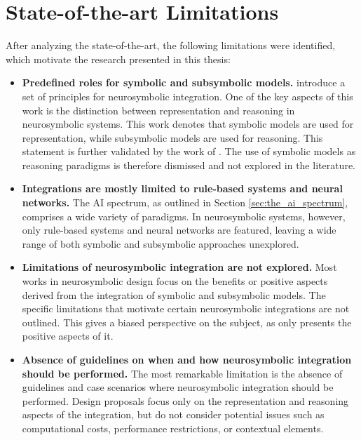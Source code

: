 \section{State-of-the-art Limitations}\label{3_sec:limitations}
After analyzing the state-of-the-art, the following limitations were identified, which motivate the research presented in this thesis:
\begin{itemize}
    \item \textbf{Predefined roles for symbolic and subsymbolic models.} \cite{besold_neural-symbolic_2017} introduce a set of principles for neurosymbolic integration. One of the key aspects of this work is the distinction between representation and reasoning in neurosymbolic systems. This work denotes that symbolic models are used for representation, while subsymbolic models are used for reasoning. This statement is further validated by the work of \cite{garcez_neural-symbolic_2019}. The use of symbolic models as reasoning paradigms is therefore dismissed and not explored in the literature.
    
    \item \textbf{Integrations are mostly limited to rule-based systems and neural networks.} The AI spectrum, as outlined in Section \ref{sec:the_ai_spectrum}, comprises a wide variety of paradigms. In neurosymbolic systems, however, only rule-based systems and neural networks are featured, leaving a wide range of both symbolic and subsymbolic approaches unexplored. 
    
    \item \textbf{Limitations of neurosymbolic integration are not explored.} Most works in neurosymbolic design focus on the benefits or positive aspects derived from the integration of symbolic and subsymbolic models. The specific limitations that motivate certain neurosymbolic integrations are not outlined. This gives a biased perspective on the subject, as only presents the positive aspects of it.
    
    \item \textbf{Absence of guidelines on when and how neurosymbolic integration should be performed.} The most remarkable limitation is the absence of guidelines and case scenarios where neurosymbolic integration should be performed. Design proposals focus only on the representation and reasoning aspects of the integration, but do not consider potential issues such as computational costs, performance restrictions, or contextual elements. 
\end{itemize}


